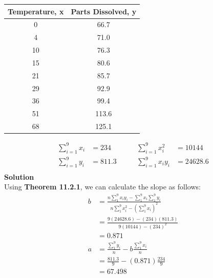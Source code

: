 \documentclass{uofa-eng-assignment}
\begin{document}
\begin{enumerate}
\begin{table}[h]
\begin{tabular}{c c}
                Temperature, x & Parts Dissolved, y \\
                \hline
                0              & 66.7               \\
                4              & 71.0               \\
                10             & 76.3               \\
                15             & 80.6               \\
                21             & 85.7               \\
                29             & 92.9               \\
                36             & 99.4               \\
                51             & 113.6              \\
                68             & 125.1              \\
                \hline
            \end{tabular}
        \end{table}
        \begin{align*}
            \sum_{i=1}^{9}x_i & = 234 \qquad   & \sum_{i=1}^{9}x_i^2  & = 10144   \\
            \sum_{i=1}^{9}y_i & = 811.3 \qquad & \sum_{i=1}^{9}x_iy_i & = 24628.6 \\
        \end{align*}
        \textbf{Solution} \\
        Using \textbf{Theorem 11.2.1}, we can calculate the slope as follows:
        \begin{align*}
            b & = \frac{n\sum_{1}^{9}x_iy_i - \sum_{1}^{9}x_i\sum_{1}^{9}y_i}{n\sum_{1}^{9}x_i^2 - (\sum_{1}^{9}x_i)^2} \\
              & = \frac{9(24628.6) - (234)(811.3)}{9(10144) - (234)^2}                                                  \\
              & = 0.871                                                                                                 \\
            a & = \frac{\sum_{1}^{9}y_i}{n} - b\frac{\sum_{1}^{9}x_i}{n}                                                \\
              & = \frac{811.3}{9} - (0.871)\frac{234}{9}                                                                \\
              & = 67.498                                                                                                \\

\end{align*}
\end{enumerate}
\end{document}
